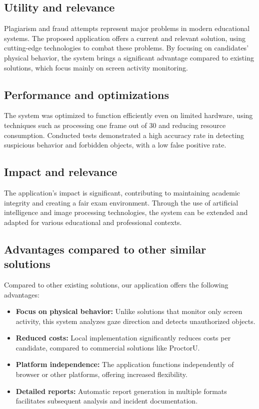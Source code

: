 \documentclass[12pt,a4paper]{article}
\begin{document}
\subsection{Utility and relevance}

Plagiarism and fraud attempts represent major problems in modern educational systems. The proposed application offers a current and relevant solution, using cutting-edge technologies to combat these problems. By focusing on candidates' physical behavior, the system brings a significant advantage compared to existing solutions, which focus mainly on screen activity monitoring.

\subsection{Performance and optimizations}

The system was optimized to function efficiently even on limited hardware, using techniques such as processing one frame out of 30 and reducing resource consumption. Conducted tests demonstrated a high accuracy rate in detecting suspicious behavior and forbidden objects, with a low false positive rate.

\subsection{Impact and relevance}

The application's impact is significant, contributing to maintaining academic integrity and creating a fair exam environment. Through the use of artificial intelligence and image processing technologies, the system can be extended and adapted for various educational and professional contexts.

\subsection{Advantages compared to other similar solutions}

Compared to other existing solutions, our application offers the following advantages:
\begin{itemize}
    \item \textbf{Focus on physical behavior:} Unlike solutions that monitor only screen activity, this system analyzes gaze direction and detects unauthorized objects.
    \item \textbf{Reduced costs:} Local implementation significantly reduces costs per candidate, compared to commercial solutions like ProctorU.
    \item \textbf{Platform independence:} The application functions independently of browser or other platforms, offering increased flexibility.
    \item \textbf{Detailed reports:} Automatic report generation in multiple formats facilitates subsequent analysis and incident documentation.
\end{itemize}
\end{document}

